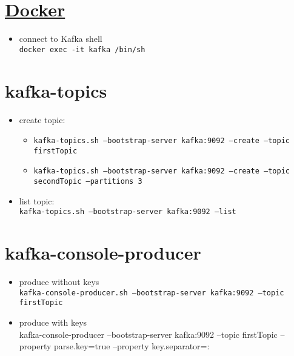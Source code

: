 \documentclass{article}
\begin{document}
\section{\href{https://towardsdatascience.com/how-to-install-apache-kafka-using-docker-the-easy-way-4ceb00817d8b}{Docker}}

\begin{itemize}
\item connect to Kafka shell\\
\texttt{docker exec -it kafka /bin/sh}
\end{itemize}

\section{kafka-topics}
\begin{itemize}
\item create topic:
\begin{itemize}
\item \texttt{kafka-topics.sh --bootstrap-server kafka:9092 --create --topic firstTopic}
\item \texttt{kafka-topics.sh --bootstrap-server kafka:9092 --create --topic secondTopic --partitions 3}
\end{itemize}


\item list topic: \\
\texttt{kafka-topics.sh --bootstrap-server kafka:9092 --list}
\end{itemize}

\section{kafka-console-producer}
\begin{itemize}
\item produce without keys\\
\texttt{kafka-console-producer.sh --bootstrap-server kafka:9092 --topic firstTopic}
\item produce with keys\\
kafka-console-producer --bootstrap-server kafka:9092 --topic firstTopic --property parse.key=true --property key.separator=:
\end{itemize}
\end{document}
